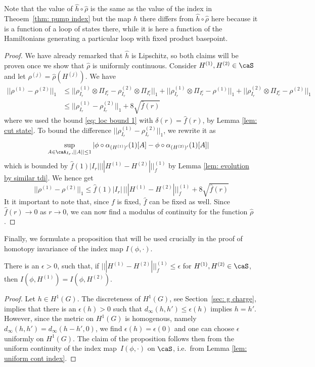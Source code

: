\noindent Note that the value of $\hat h\circ \hat\rho$ is the same as the value of the index in Theoem~\ref{thm: pump index} but the map $h$ there differs from $\hat h\circ \hat\rho$ here because it is a function of a loop of states there, while it is here a function of the Hamiltonians generating a particular loop with fixed product basepoint.
\begin{proof}
	We have already remarked that $\hat{h}$ is Lipschitz, so both claims will be proven once we show that $\hat{\rho}$ is uniformly continuous. 
	Consider $H^{(1)},H^{(2)}\in \caS$ and let $\rho^{(j)}=\hat{\rho}(H^{(j)})$.
	We have
	\begin{align*}
	||\rho^{(1)}-\rho^{(2)}||_1  &\leq    ||\rho^{(1)}_{I_r} \otimes\Pi_{I_r^c}-\rho^{(2)}_{I_r}\otimes\Pi_{I_r^c}||_1 +  ||\rho^{(1)}_{I_r}\otimes\Pi_{I_r^c}-\rho^{(1)}||_1  +   ||\rho^{(2)}_{I_r}\otimes\Pi_{I_r^c}-\rho^{(2)}||_1 \\
	&\leq  ||\rho^{(1)}_{I_r} -\rho^{(2)}_{I_r}||_1   +  8\sqrt{\hat{f}(r)}
	\end{align*}
	where we used the bound \eqref{eq: loc bound 1} with $\delta(r)=\hat{f}(r)$, by Lemma \ref{lem: cut state}. 
	To bound  the difference
	$||\rho^{(1)}_{I_r} -\rho^{(2)}_{I_r}||_1 $, we rewrite it as
	\begin{align}
	&\sup_{A \in \caA_{I_r}, ||A||\leq 1} |\phi\circ\alpha_{(H^{(1)})'}(1)[A]-\phi\circ\alpha_{(H^{(2)})'}(1)[A]| 
	\end{align}
	which is bounded by $ \hat{f}(1)|I_r| |||H^{(1)}-H^{(2)}|||^{(1)}_f   $ by Lemma \ref{lem: evolution by similar tdi}. 
	We hence get 
	$$
	||\rho^{(1)}-\rho^{(2)}||_1 \leq    \hat{f}(1)|I_r|\, |||H^{(1)}-H^{(2)}|||^{(1)}_f +   8 \sqrt{\hat f(r)}        
	$$
	It it important to note that, since $f$ is fixed, $\hat{f}$ can be fixed as well.  Since $\hat f(r) \to 0$ as $r\to 0$, we can now find a modulus of continuity for the function $\hat{\rho}$.
\end{proof}


Finally, we formulate a proposition that will be used crucially in the proof of homotopy invariance of the index map $I(\phi,\cdot)$. 
\begin{proposition}\label{prop: finite index set}
	There is an $ \epsilon>0$, such that, if $|||H^{(1)}-H^{(2)}|||^{(1)}_f \leq \epsilon$ for $H^{(1)}, H^{(2)}\in\caS$, then $I(\phi,H^{(1)})=I(\phi,H^{(2)})$. 
\end{proposition}
\begin{proof}
	Let $h\in H^1(G)$. The discreteness of $H^1(G)$, see Section~\ref{sec: g charge}, implies that there is an $\epsilon(h)>0$ such that
	$d_{\infty}(h,h')\leq \epsilon(h)$ implies $h=h'$.  However, since the metric on $H^1(G)$ is homogenous, namely $d_{\infty}(h,h') = d_{\infty}(h-h',0)$, we find  $\epsilon(h)=\epsilon(0)$ and one can choose $\epsilon$ uniformly on $H^1(G)$.  The claim of the proposition follows then from the uniform continuity of the index map~$I(\phi,\cdot)$ on $\caS$, i.e.\ from Lemma \ref{lem: uniform cont index}. 
\end{proof}




